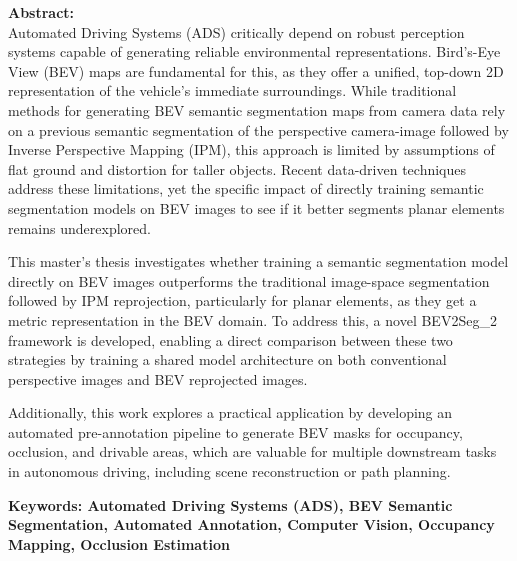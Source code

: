 \begin{itshape}
    \textbf{Abstract:} \\

Automated Driving Systems (ADS) critically depend on robust perception systems capable of generating reliable environmental representations. Bird's-Eye View (BEV) maps are fundamental for this, as they offer a unified, top-down 2D representation of the vehicle's immediate surroundings. While traditional methods for generating BEV semantic segmentation maps from camera data rely on a previous semantic segmentation of the perspective camera-image followed by Inverse Perspective Mapping (IPM), this approach is limited by assumptions of flat ground and distortion for taller objects. Recent data-driven techniques address these limitations, yet the specific impact of directly training semantic segmentation models on BEV images to see if it better segments planar elements remains underexplored.

This master's thesis investigates whether training a semantic segmentation model directly on BEV images outperforms the traditional image-space segmentation followed by IPM reprojection, particularly for planar elements, as they get a metric representation in the BEV domain. To address this, a novel BEV2Seg\_2 framework is developed, enabling a direct comparison between these two strategies by training a shared model architecture on both conventional perspective images and BEV reprojected images. 

Additionally, this work explores a practical application by developing an automated pre-annotation pipeline to generate BEV masks for occupancy, occlusion, and drivable areas, which are valuable for multiple downstream tasks in autonomous driving, including scene reconstruction or path planning.

    \textbf{Keywords: Automated Driving Systems (ADS), BEV Semantic Segmentation, Automated Annotation, Computer Vision, Occupancy Mapping, Occlusion Estimation}
\end{itshape}
\newpage
